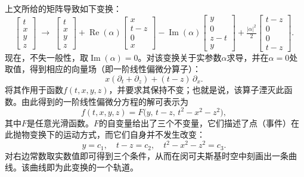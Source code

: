 上文所给的矩阵导致如下变换：
\[
\begin{bmatrix}
t \\ x \\ y \\ z
\end{bmatrix}
\;\longrightarrow\;
\begin{bmatrix}
t \\ x \\ y \\ z
\end{bmatrix}
+ \operatorname{Re}(\alpha)
\begin{bmatrix}
x \\ t-z \\ 0 \\ x
\end{bmatrix}
- \operatorname{Im}(\alpha)
\begin{bmatrix}
y \\ 0 \\ z-t \\ y
\end{bmatrix}
+ \tfrac{|\alpha|^{2}}{2}
\begin{bmatrix}
t-z \\ 0 \\ 0 \\ t-z
\end{bmatrix}.~
\]
现在，不失一般性，取$\operatorname{Im}(\alpha) = 0$。对该变换关于实参数$\alpha$求导，并在$\alpha=0$处取值，得到相应的向量场（即一阶线性偏微分算子）：
\[
x\left(\partial_{t} + \partial_{z}\right) + (t-z)\,\partial_{x}.~
\]
将其作用于函数$f(t,x,y,z)$，并要求其保持不变；也就是说，该算子湮灭此函数。由此得到的一阶线性偏微分方程的解可表示为
\[
f(t,x,y,z) = F\bigl(y,\, t-z,\, t^{2}-x^{2}-z^{2}\bigr),~
\]
其中$F$是任意光滑函数。$F$的自变量给出了三个不变量，它们描述了点（事件）在此抛物变换下的运动方式，而它们自身并不发生改变：
\[
y = c_{1}, \quad t-z = c_{2}, \quad t^{2} - x^{2} - z^{2} = c_{3}.~
\]
对右边常数取实数值即可得到三个条件，从而在闵可夫斯基时空中刻画出一条曲线。该曲线即为此变换的一个轨道。

